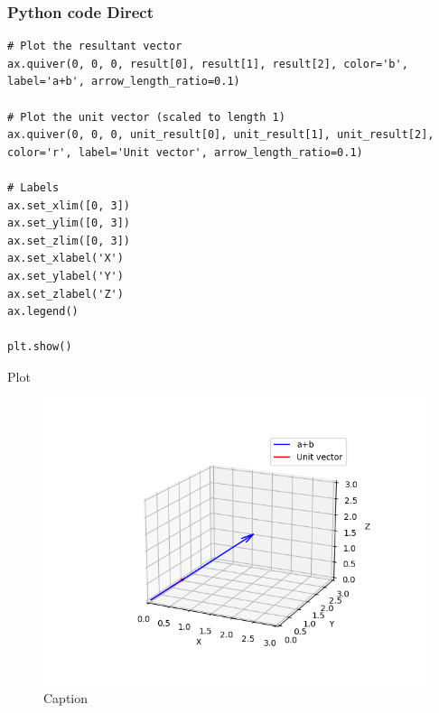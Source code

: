 \documentclass{beamer}
\begin{document}
\begin{frame}[fragile]
\frametitle{Python code Direct}
\begin{lstlisting}
# Plot the resultant vector
ax.quiver(0, 0, 0, result[0], result[1], result[2], color='b', label='a+b', arrow_length_ratio=0.1)

# Plot the unit vector (scaled to length 1)
ax.quiver(0, 0, 0, unit_result[0], unit_result[1], unit_result[2], color='r', label='Unit vector', arrow_length_ratio=0.1)

# Labels
ax.set_xlim([0, 3])
ax.set_ylim([0, 3])
ax.set_zlim([0, 3])
ax.set_xlabel('X')
ax.set_ylabel('Y')
ax.set_zlabel('Z')
ax.legend()

plt.show()
\end{lstlisting}
\end{frame}

\begin{frame}{Plot}
\begin{figure}
    \centering
    \includegraphics[width=1.0\columnwidth]{fig-1.png}
    \caption{Caption}
    \label{fig:placeholder}
\end{figure}
    
\end{frame}
\end{document}
